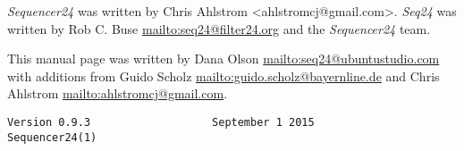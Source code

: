    \textsl{Sequencer24} was written by Chris Ahlstrom <ahlstromcj@gmail.com>.
   \textsl{Seq24} was written by Rob C. Buse \url{mailto:seq24@filter24.org}
   and the \textsl{Sequencer24} team.

   This manual page was written by Dana Olson
   \url{mailto:seq24@ubuntustudio.com} with additions from Guido Scholz
   \url{mailto:guido.scholz@bayernline.de} and Chris Ahlstrom
   \url{mailto:ahlstromcj@gmail.com}.

   \begin{verbatim}
Version 0.9.3                   September 1 2015                  Sequencer24(1)
   \end{verbatim}

